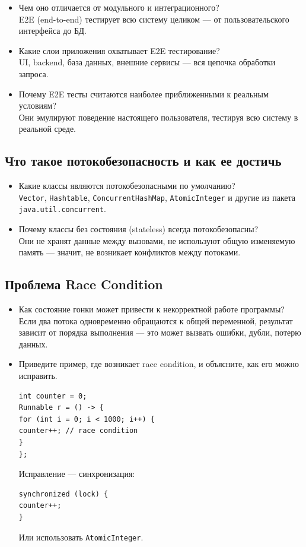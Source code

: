 \documentclass[a4paper,14pt]{article}
\begin{document}
\begin{itemize}
\item Чем оно отличается от модульного и интеграционного? \\
E2E (end-to-end) тестирует всю систему целиком — от пользовательского интерфейса до БД.

\item Какие слои приложения охватывает E2E тестирование? \\
UI, backend, база данных, внешние сервисы — вся цепочка обработки запроса.

\item Почему E2E тесты считаются наиболее приближенными к реальным условиям? \\
Они эмулируют поведение настоящего пользователя, тестируя всю систему в реальной среде.
\end{itemize}

\subsection{Что такое потокобезопасность и как ее достичь}

\begin{itemize}
\item Какие классы являются потокобезопасными по умолчанию? \\
\texttt{Vector}, \texttt{Hashtable}, \texttt{ConcurrentHashMap}, \texttt{AtomicInteger} и другие из пакета \texttt{java.util.concurrent}.

\item Почему классы без состояния (stateless) всегда потокобезопасны? \\
Они не хранят данные между вызовами, не используют общую изменяемую память — значит, не возникает конфликтов между потоками.
\end{itemize}

\subsection{Проблема Race Condition}

\begin{itemize}
\item Как состояние гонки может привести к некорректной работе программы? \\
Если два потока одновременно обращаются к общей переменной, результат зависит от порядка выполнения — это может вызвать ошибки, дубли, потерю данных.

\item Приведите пример, где возникает race condition, и объясните, как его можно исправить. \
\begin{lstlisting}[style=javastyle]
int counter = 0;
Runnable r = () -> {
for (int i = 0; i < 1000; i++) {
counter++; // race condition
}
};
\end{lstlisting}
Исправление — синхронизация:
\begin{lstlisting}[style=javastyle]
synchronized (lock) {
counter++;
}
\end{lstlisting}
Или использовать \texttt{AtomicInteger}.
\end{itemize}
\end{document}
